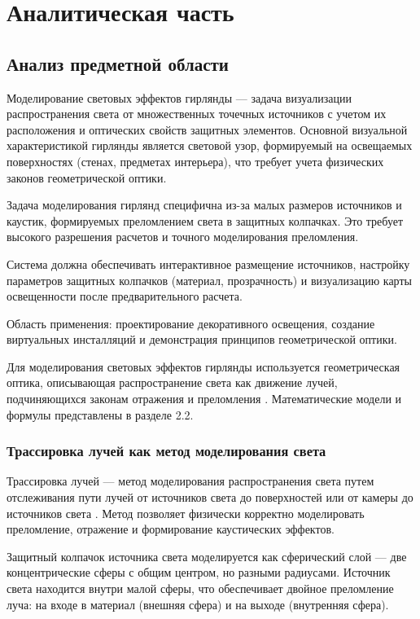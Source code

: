 \chapter{Аналитическая часть}

\section{Анализ предметной области}

Моделирование световых эффектов гирлянды --- задача визуализации распространения света от множественных точечных источников с учетом их расположения и оптических свойств защитных элементов. Основной визуальной характеристикой гирлянды является световой узор, формируемый на освещаемых поверхностях (стенах, предметах интерьера), что требует учета физических законов геометрической оптики.

Задача моделирования гирлянд специфична из-за малых размеров источников и каустик, формируемых преломлением света в защитных колпачках. Это требует высокого разрешения расчетов и точного моделирования преломления.

Система должна обеспечивать интерактивное размещение источников, настройку параметров защитных колпачков (материал, прозрачность) и визуализацию карты освещенности после предварительного расчета.

Область применения: проектирование декоративного освещения, создание виртуальных инсталляций и демонстрация принципов геометрической оптики.

Для моделирования световых эффектов гирлянды используется геометрическая оптика, описывающая распространение света как движение лучей, подчиняющихся законам отражения и преломления \cite{1,3}. Математические модели и формулы представлены в разделе 2.2.

\subsection{Трассировка лучей как метод моделирования света}

Трассировка лучей --- метод моделирования распространения света путем отслеживания пути лучей от источников света до поверхностей или от камеры до источников света \cite{2,4}. Метод позволяет физически корректно моделировать преломление, отражение и формирование каустических эффектов.

Защитный колпачок источника света моделируется как сферический слой --- две концентрические сферы с общим центром, но разными радиусами. Источник света находится внутри малой сферы, что обеспечивает двойное преломление луча: на входе в материал (внешняя сфера) и на выходе (внутренняя сфера).

